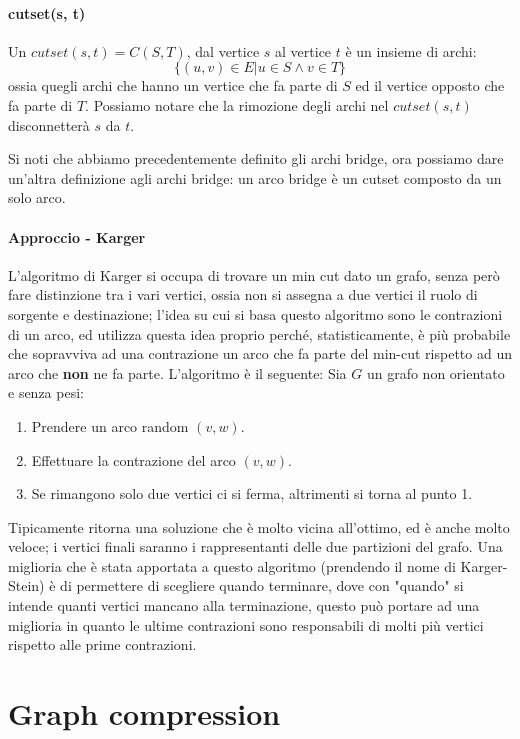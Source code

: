 \documentclass[12pt,a4paper]{article}
\begin{document}
\subsection{cutset(s, t)}
Un $cutset(s, t) = C(S, T)$, dal vertice $s$ al vertice $t$ è un insieme di archi:
$$\lbrace (u, v) \in E \vert   u \in S \wedge v \in T\rbrace$$
ossia quegli archi che hanno un vertice che fa parte di $S$ ed il vertice opposto che fa parte di $T$. Possiamo notare che la rimozione degli archi nel $cutset(s, t)$ disconnetterà $s$ da $t$.

Si noti che abbiamo precedentemente definito gli archi bridge, ora possiamo dare un'altra definizione agli archi bridge: un arco bridge è un cutset composto da un solo arco.

\subsection{Approccio - Karger}
L'algoritmo di Karger si occupa di trovare un min cut dato un grafo, senza però fare distinzione tra i vari vertici, ossia non si assegna a due vertici il ruolo di sorgente e destinazione; l'idea su cui si basa questo algoritmo sono le contrazioni di un arco, ed utilizza questa idea proprio perché, statisticamente, è più probabile che sopravviva ad una contrazione un arco che fa parte del min-cut rispetto ad un arco che \textbf{non} ne fa parte. L'algoritmo è il seguente: Sia $G$ un grafo non orientato e senza pesi:
\begin{enumerate}
\item Prendere un arco random $(v, w)$.
\item Effettuare la contrazione del arco $(v, w)$.
\item Se rimangono solo due vertici ci si ferma, altrimenti si torna al punto 1.
\end{enumerate}
Tipicamente ritorna una soluzione che è molto vicina all'ottimo, ed è anche molto veloce; i vertici finali saranno i rappresentanti delle due partizioni del grafo. Una miglioria che è stata apportata a questo algoritmo (prendendo il nome di Karger-Stein) è di permettere di scegliere quando terminare, dove con "quando" si intende quanti vertici mancano alla terminazione, questo può portare ad una miglioria in quanto le ultime contrazioni sono responsabili di molti più vertici rispetto alle prime contrazioni.

\pagebreak
\part{Graph compression}
\end{document}
